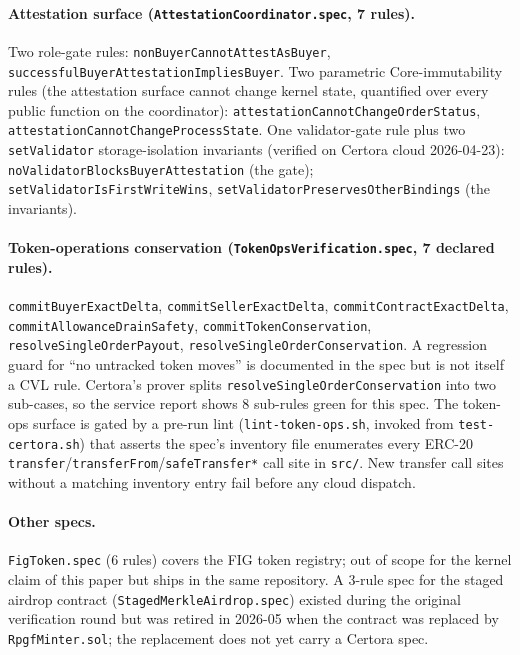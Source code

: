 \documentclass[11pt,a4paper]{article}
\theoremstyle{definition}
\theoremstyle{remark}
\begin{document}
\paragraph{Attestation surface (\texttt{AttestationCoordinator.spec}, 7 rules).}
Two role-gate rules:
\texttt{nonBuyerCannotAttestAsBuyer},
\texttt{successfulBuyerAttestationImpliesBuyer}.
Two parametric Core-immutability rules (the attestation surface cannot
change kernel state, quantified over every public function on the
coordinator):
\texttt{attestationCannotChangeOrderStatus},
\texttt{attestationCannotChangeProcessState}.
One validator-gate rule plus two \texttt{setValidator}
storage-isolation invariants (verified on Certora cloud 2026-04-23):
\texttt{noValidatorBlocksBuyerAttestation} (the gate);
\texttt{setValidatorIsFirstWriteWins},
\texttt{setValidatorPreservesOtherBindings} (the invariants).

\paragraph{Token-operations conservation (\texttt{TokenOpsVerification.spec}, 7 declared rules).}
\texttt{commitBuyerExactDelta},
\texttt{commitSellerExactDelta},
\texttt{commitContractExactDelta},
\texttt{commitAllowanceDrainSafety},
\texttt{commitTokenConservation},
\texttt{resolveSingleOrderPayout},
\texttt{resolveSingleOrderConservation}.
A regression guard for ``no untracked token moves'' is documented in
the spec but is not itself a CVL rule. Certora's prover splits
\texttt{resolveSingleOrderConservation} into two sub-cases, so the
service report shows 8 sub-rules green for this spec.
The token-ops surface is gated by a pre-run lint
(\texttt{lint-token-ops.sh}, invoked from \texttt{test-certora.sh})
that asserts the spec's inventory file enumerates every ERC-20
\texttt{transfer}/\texttt{transferFrom}/\texttt{safeTransfer*} call
site in \texttt{src/}. New transfer call sites without a matching
inventory entry fail before any cloud dispatch.

\paragraph{Other specs.}
\texttt{FigToken.spec} (6 rules) covers the FIG token registry;
out of scope for the kernel claim of this paper but ships in the
same repository. A 3-rule spec for the staged airdrop contract
(\texttt{StagedMerkleAirdrop.spec}) existed during the original
verification round but was retired in 2026-05 when the contract
was replaced by \texttt{RpgfMinter.sol}; the replacement does not
yet carry a Certora spec.
\end{document}
